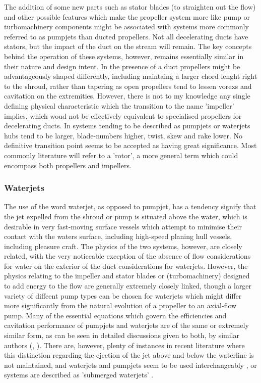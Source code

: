 \documentclass{article}\usepackage[]{graphicx}\usepackage[]{color}
\begin{document}
The addition of some new parts such as stator blades (to straighten out the flow) and other possible features which make the propeller system more like pump or turbomachinery components might be associated with systems more commonly referred to as pumpjets than ducted propellers.  Not all decelerating ducts have stators, but the impact of the duct on the stream will remain. The key concepts behind the operation of these systems, however, remains essentially similar in their nature and design intent.  In the presence of a duct propellers might be advantageously shaped differently, including maintaing a larger chord lenght right to the shroud, rather than tapering as open propellers tend to lessen vorexs and cavitation on the extremities.  However, there is not to my knowledge any single defining physical characteristic which the transition to the name 'impeller' implies, which woud not be effectively equivalent to specialised propellers for decelerating ducts.  In systems tending to be described as pumpjets or waterjets hubs tend to be larger, blade-numbers higher, twist, skew and rake lower.  No definitive transition point seems to be accepted as having great significance.  Most commonly literature will refer to a 'rotor', a more general term which could encompass both propellers and impellers.

\subsubsection{Waterjets}
The use of the word waterjet, as opposed to pumpjet, has a tendency signify that the jet expelled from the shroud or pump is situated above the water, which is desirable in very fast-moving surface vessels which attempt to minimise their contact with the waters surface, including high-speed planing hull vessels, including pleasure craft.  The physics of the two systems, however, are closely related, with the very noticeable exception of the absence of flow considerations for water on the exterior of the duct considerations for waterjets.  However, the physics relating to the impeller and stator blades or (turbomachinery) designed to add energy to the flow are generally extremely closely linked, though a larger variety of diffeent pump types can be chosen for waterjets which might differ more significantly from the natural evolution of a propeller to an axial-flow pump. Many of the essential equations which govern the efficiencies and cavitation performance of pumpjets and waterjets are of the same or extremely similar form, as can be seen in detailed discussions given to both, by similar authors (\cite{wislicenus1973}, \cite{henderson1964}).  There are, however, plenty of instances in recent literature where this distinction regarding the ejection of the jet above and below the waterline is not maintained, and waterjets and pumpjets seem to be used interchangeably \parencite{abdel2010}, or systems are described as 'submerged waterjets' \parencite{buckingham2008submarine}.
\end{document}
